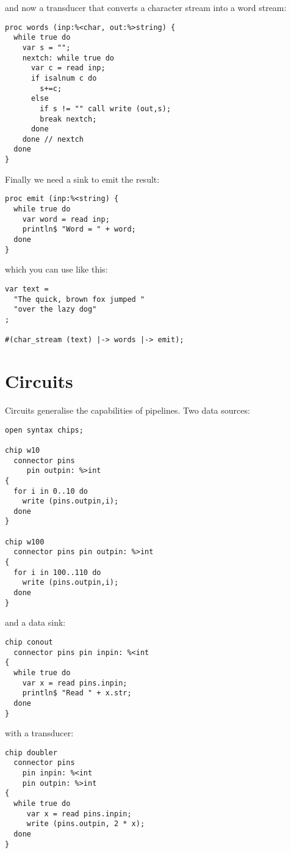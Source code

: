 \documentclass[oneside]{book}
\begin{document}
and now a transducer that converts a character
stream into a word stream:

\begin{verbatim}
proc words (inp:%<char, out:%>string) {
  while true do
    var s = "";
    nextch: while true do
      var c = read inp;
      if isalnum c do
        s+=c;
      else 
        if s != "" call write (out,s);
        break nextch;
      done
    done // nextch
  done
}
\end{verbatim}

Finally we need a sink to emit the result:

\begin{verbatim}
proc emit (inp:%<string) {
  while true do
    var word = read inp;
    println$ "Word = " + word;
  done
}
\end{verbatim}

which you can use like this:

\begin{verbatim}
var text = 
  "The quick, brown fox jumped "
  "over the lazy dog"
;

#(char_stream (text) |-> words |-> emit);
\end{verbatim}

\section{Circuits}

Circuits generalise the capabilities of pipelines.
Two data sources:

\begin{verbatim}
open syntax chips;

chip w10 
  connector pins
     pin outpin: %>int 
{ 
  for i in 0..10 do 
    write (pins.outpin,i);
  done
}

chip w100
  connector pins pin outpin: %>int 
{ 
  for i in 100..110 do 
    write (pins.outpin,i);
  done
}
\end{verbatim}

and a data sink:

\begin{verbatim}
chip conout 
  connector pins pin inpin: %<int 
{ 
  while true do
    var x = read pins.inpin;
    println$ "Read " + x.str;
  done
}
\end{verbatim}

with a transducer:

\begin{verbatim}
chip doubler
  connector pins 
    pin inpin: %<int
    pin outpin: %>int
{
  while true do
     var x = read pins.inpin;
     write (pins.outpin, 2 * x);
  done
}
\end{verbatim}
\end{document}
